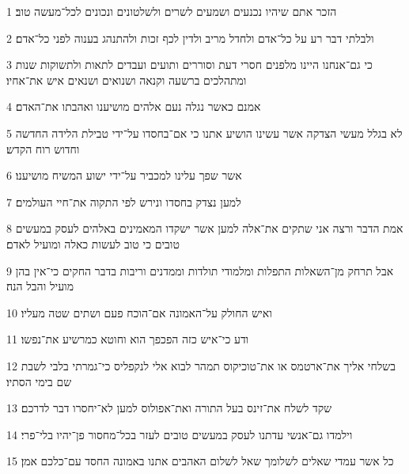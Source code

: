 \par 1 הזכר אתם שיהיו נכנעים ושמעים לשרים ולשלטונים ונכונים לכל־מעשה טוב׃
\par 2 ולבלתי דבר רע על כל־אדם ולחדל מריב ולדין לכף זכות ולהתנהג בענוה לפני כל־אדם׃
\par 3 כי גם־אנחנו היינו מלפנים חסרי דעת וסוררים ותועים ועבדים לתאות ולתשוקות שנות ומתהלכים ברשעה וקנאה ושנואים ושנאים איש את־אחיו׃
\par 4 אמנם כאשר נגלה נעם אלהים מושיענו ואהבתו את־האדם׃
\par 5 לא בגלל מעשי הצדקה אשר עשינו הושיע אתנו כי אם־בחסדו על־ידי טבילת הלידה החדשה וחדוש רוח הקדש׃
\par 6 אשר שפך עלינו למכביר על־ידי ישוע המשיח מושיענו׃
\par 7 למען נצדק בחסדו ונירש לפי התקוה את־חיי העולמים׃
\par 8 אמת הדבר ורצה אני שתקים את־אלה למען אשר ישקדו המאמינים באלהים לעסק במעשים טובים כי טוב לעשות כאלה ומועיל לאדם׃
\par 9 אבל תרחק מן־השאלות התפלות ומלמודי תולדות וממדנים וריבות בדבר החקים כי־אין בהן מועיל והבל הנה׃
\par 10 ואיש החולק על־האמונה אם־הוכח פעם ושתים שטה מעליו׃
\par 11 ודע כי־איש כזה הפכפך הוא וחוטא כמרשיע את־נפשו׃
\par 12 בשלחי אליך את־ארטמס או את־טוכיקוס תמהר לבוא אלי לנקפליס כי־גמרתי בלבי לשבת שם בימי הסתיו׃
\par 13 שקד לשלח את־זינס בעל התורה ואת־אפולוס למען לא־יחסרו דבר לדרכם׃
\par 14 וילמדו גם־אנשי עדתנו לעסק במעשים טובים לעזר בכל־מחסור פן־יהיו בלי־פרי׃
\par 15 כל אשר עמדי שאלים לשלומך שאל לשלום האהבים אתנו באמונה החסד עם־כלכם אמן׃


